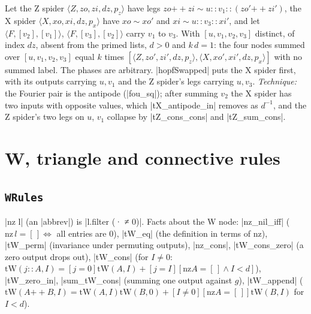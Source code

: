 \begin{lemma}
Let the Z spider $\langle Z,zo,zi,dz,p_z\rangle$ have legs $zo\mathbin{+\!\!+}zi\sim u{::}v_1{::}(zo'\mathbin{+\!\!+}zi')$,
the X spider $\langle X,xo,xi,dz,p_x\rangle$ have $xo\sim xo'$ and $xi\sim u{::}v_3{::}xi'$, and let
$\langle F,[v_2],[v_1]\rangle$, $\langle F,[v_3],[v_2]\rangle$ carry $v_1$ to $v_3$. With
$[u,v_1,v_2,v_3]$ distinct, of index $dz$, absent from the primed lists, $d>0$ and $k\,d=1$:
the four nodes summed over $[u,v_1,v_2,v_3]$ equal $k$ times
$[\langle Z,zo',zi',dz,p_z\rangle,\langle X,xo',xi',dz,p_x\rangle]$ with no summed label. The phases
are arbitrary. \lean|hopfSwapped| puts the X spider first, with its outputs carrying $u,v_1$ and the
Z spider's legs carrying $u,v_3$. \emph{Technique:} the Fourier pair is the antipode
(\lean|fou_sq|); after summing $v_2$ the X spider has two inputs with opposite values, which
\lean|tX_antipode_in| removes as $d^{-1}$, and the Z spider's two legs on $u$, $v_1$ collapse by
\lean|tZ_cons_cons| and \lean|tZ_sum_cons|.
\end{lemma}

\section{W, triangle and connective rules}\label{sec:lean-core-wrules}

\subsection{\texttt{WRules}}

\lean|nz l| (an \lean|abbrev|) is \lean|l.filter (· ≠ 0)|. Facts about the W node:
\lean|nz_nil_iff| ($\mathrm{nz}\,l=[\,]\iff$ all entries are $0$), \lean|tW_eq| (the definition in
terms of $\mathrm{nz}$), \lean|tW_perm| (invariance under permuting outputs), \lean|nz_cons|,
\lean|tW_cons_zero| (a zero output drops out), \lean|tW_cons| (for $I\ne0$:
$\mathrm{tW}(j{::}A,I)=[j=0]\mathrm{tW}(A,I)+[j=I][\mathrm{nz}A=[\,]\land I<d]$),
\lean|tW_zero_in|, \lean|sum_tW_cons| (summing one output against $g$), \lean|tW_append|
($\mathrm{tW}(A\mathbin{+\!\!+}B,I)=\mathrm{tW}(A,I)\mathrm{tW}(B,0)+[I\ne0][\mathrm{nz}A=[\,]]\mathrm{tW}(B,I)$
for $I<d$).

